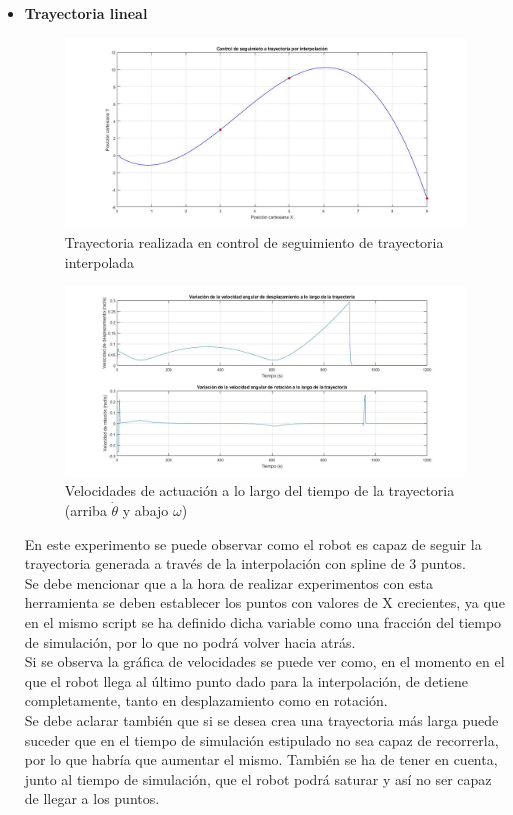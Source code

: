 \documentclass[a4paper,twoside]{article}
\begin{document}
\begin{itemize}
		\item \textbf{Trayectoria lineal}
		\begin{figure}[H]
			\centering
			\includegraphics[width=1\textwidth]{control_tray_2}
			\caption{Trayectoria realizada en control de seguimiento de trayectoria interpolada}
		\end{figure}
		\begin{figure}[H]
			\centering
			\includegraphics[width=1\textwidth]{control_tray_2_2}
			\caption{Velocidades de actuación a lo largo del tiempo de la trayectoria (arriba $\dot{\theta}$ y abajo $\omega$)}
		\end{figure}
		En este experimento se puede observar como el robot es capaz de seguir la trayectoria generada a través de la interpolación con spline de 3 puntos.\\
		Se debe mencionar que a la hora de realizar experimentos con esta herramienta se deben establecer los puntos con valores de X crecientes, ya que en el mismo script se ha definido dicha variable como una fracción del tiempo de simulación, por lo que no podrá volver hacia atrás.\\
		
		Si se observa la gráfica de velocidades se puede ver como, en el momento en el que el robot llega al último punto dado para la interpolación, de detiene completamente, tanto en desplazamiento como en rotación.\\
		
		Se debe aclarar también que si se desea crea una trayectoria más larga puede suceder que en el tiempo de simulación estipulado no sea capaz de recorrerla, por lo que habría que aumentar el mismo. También se ha de tener en cuenta, junto al tiempo de simulación, que el robot podrá saturar y así no ser capaz de llegar a los puntos.
	\end{itemize}
	
\end{document}
